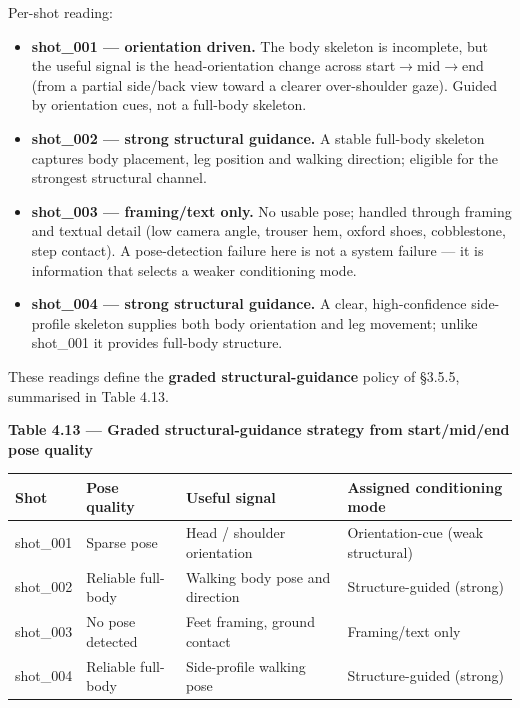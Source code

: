 \documentclass[10pt,twocolumn,letterpaper]{article}
\begin{document}
Per-shot reading:

\begin{itemize}[leftmargin=1.2em,itemsep=2pt,topsep=2pt]

\item \textbf{shot\_001 --- orientation driven.} The body skeleton is incomplete, but the useful signal is the head-orientation change across start$\rightarrow$mid$\rightarrow$end (from a partial side/back view toward a clearer over-shoulder gaze). Guided by orientation cues, not a full-body skeleton.

\item \textbf{shot\_002 --- strong structural guidance.} A stable full-body skeleton captures body placement, leg position and walking direction; eligible for the strongest structural channel.

\item \textbf{shot\_003 --- framing/text only.} No usable pose; handled through framing and textual detail (low camera angle, trouser hem, oxford shoes, cobblestone, step contact). A pose-detection failure here is not a system failure --- it is information that selects a weaker conditioning mode.

\item \textbf{shot\_004 --- strong structural guidance.} A clear, high-confidence side-profile skeleton supplies both body orientation and leg movement; unlike shot\_001 it provides full-body structure.

\end{itemize}

These readings define the \textbf{graded structural-guidance} policy of \S{}3.5.5, summarised in Table 4.13.

\begin{table}[t]
\centering
{\footnotesize\textbf{\textbf{Table 4.13 --- Graded structural-guidance strategy from start/mid/end pose quality}}}\par\vspace{3pt}
\footnotesize
\begin{tabularx}{\textwidth}{l>{\RaggedRight\arraybackslash}X>{\RaggedRight\arraybackslash}X>{\RaggedRight\arraybackslash}X}
\toprule
Shot & Pose quality & Useful signal & Assigned conditioning mode \\
\midrule
shot\_001 & Sparse pose & Head / shoulder orientation & Orientation-cue (weak structural) \\
shot\_002 & Reliable full-body & Walking body pose and direction & Structure-guided (strong) \\
shot\_003 & No pose detected & Feet framing, ground contact & Framing/text only \\
shot\_004 & Reliable full-body & Side-profile walking pose & Structure-guided (strong) \\
\bottomrule
\end{tabularx}
\end{table}
\end{document}

